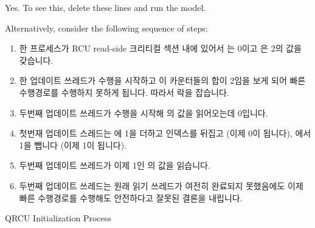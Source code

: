 {{	Yes.  To see this, delete these lines and run the model.

	Alternatively, consider the following sequence of steps:

	\fi

	\begin{enumerate}
	\item	한 프로세스가 RCU read-side 크리티컬 섹션 내에 있어서
		 는 0이고  은 2의 값을 갖습니다.
	\item	한 업데이트 쓰레드가 수행을 시작하고 이 카운터들의 합이 2임을
		보게 되어 빠른 수행경로를 수행하지 못하게 됩니다.  따라서 락을
		잡습니다.
	\item	두번째 업데이트 쓰레드가 수행을 시작해  의 값을
		읽어오는데 0입니다.
	\item	첫번재 업데이트 스레드는  에 1을 더하고 인덱스를
		뒤집고 (이제 0이 됩니다),  에서 1을 뺍니다 (이제 1이
		됩니다).
	\item	두번째 업데이트 쓰레드가 이제 1인  의 값을 읽습니다.
	\item	두번째 업데이트 쓰레드는 원래 읽기 쓰레드가 여전히 완료되지
		못했음에도 이제 빠른 수행경로를 수행해도 안전하다고 잘못된
		결론을 내립니다.

	\iffalse

	\item	One process is within its RCU read-side critical
		section, so that the value of \co{ctr[0]} is zero and
		the value of \co{ctr[1]} is two.
	\item	An updater starts executing, and sees that the sum of
		the counters is two so that the fastpath cannot be
		executed.  It therefore acquires the lock.
	\item	A second updater starts executing, and fetches the value
		of \co{ctr[0]}, which is zero.
	\item	The first updater adds one to \co{ctr[0]}, flips
		the index (which now becomes zero), then subtracts
		one from \co{ctr[1]} (which now becomes one).
	\item	The second updater fetches the value of \co{ctr[1]},
		which is now one.
	\item	The second updater now incorrectly concludes that it
		is safe to proceed on the fastpath, despite the fact
		that the original reader has not yet completed.

	\fi

	\end{enumerate}
}\QuickQuizEndE
}

\begin{listing}[htbp]

\caption{QRCU Initialization Process}
\label{lst:formal:QRCU Initialization Process}
\end{listing}

